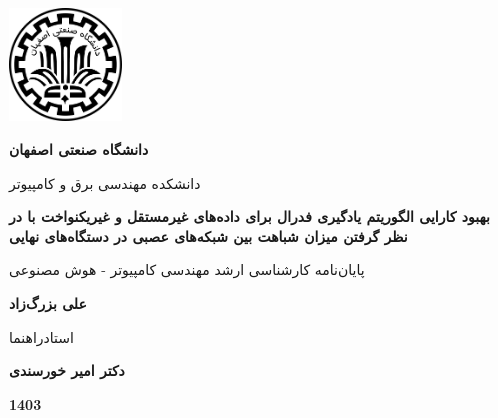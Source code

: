 \thispagestyle{empty}
\begin{center}
\includegraphics[height=3cm]{iut_logo.png}
\vspace{0.4cm}

\textbf{دانشگاه صنعتی اصفهان}\\
\vspace{0.4cm}

{\large

	دانشکده مهندسی برق و کامپیوتر
}
\vspace{3.5cm}

{\LARGE
	\textbf{
	بهبود کارایی الگوریتم یادگیری فدرال برای داده‌های غیرمستقل و غیریکنواخت با در نظر گرفتن میزان شباهت بین شبکه‌های عصبی در دستگاه‌های نهایی
	}
	\\
}
\vspace{3.5cm}

{\large
	پایان‌نامه کارشناسی ارشد مهندسی کامپیوتر - هوش مصنوعی
}
\vspace{1cm}

{\Large
	\textbf{علی بزرگ‌زاد}\\
}
\vspace{2.5cm}

{\large
	استادراهنما\\
}
\vspace{0.5cm}

{\Large
	\textbf{دکتر امیر خورسندی}\\
}
\vspace{3.34cm}

\textbf{1403}

\end{center}
\restoregeometry
\pagebreak

